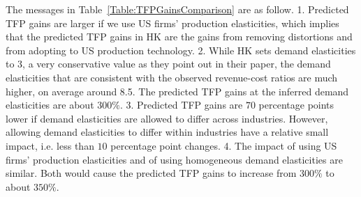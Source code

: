 \documentclass[12pt]{article}
\begin{document}
The messages in Table~\ref{Table:TFPGainsComparison} are as follow. 1. Predicted TFP gains are larger if we use US firms' production elasticities, which implies that the predicted TFP gains in HK are the gains from removing distortions and from adopting to US production technology. 2. While HK sets demand elasticities to 3, a very conservative value as they point out in their paper, the demand elasticities that are consistent with the observed revenue-cost ratios are much higher, on average around 8.5. The predicted TFP gains at the inferred demand elasticities are about $300\%$. 3. Predicted TFP gains are $70$ percentage points lower if demand elasticities are allowed to differ across industries. However, allowing demand elasticities to differ within industries have a relative small impact, i.e. less than $10$ percentage point changes. 4. The impact of using US firms' production elasticities and of using homogeneous demand elasticities are similar. Both would cause the predicted TFP gains to increase from $300\%$ to about $350\%$. \label{par:TFP gainsComparisonDiscussion}



%

  


\end{document}

